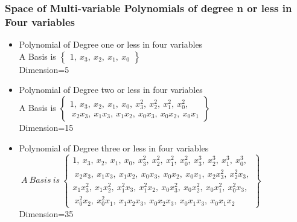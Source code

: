 \documentclass{beamer}
\begin{document}
\begin{frame}
\frametitle{Space of Multi-variable Polynomials of degree n or less in Four variables}
\begin{block}{}
\begin{itemize}
\item Polynomial of Degree one or less in four variables\\ 
A Basis is $\begin{Bmatrix}1,~ x_3,~ x_2,~ x_1,~ x_0
\end{Bmatrix}$\\
Dimension=5\\
\item Polynomial of Degree two or less in four variables \\
A Basis is $\begin{Bmatrix}1,~ x_3,~ x_2,~ x_1,~ x_0,~ x_3^2,~ x_2^2,~ x_1^2,~ x_0^2,\\~ x_2x_3,~ x_1x_3,~ x_1x_2,~ x_0x_3,~ x_0x_2,~ x_0x_1
\end{Bmatrix}$\\
Dimension=15\\
\item Polynomial of Degree three or less in four variables \\
\newcommand\fontsizex{\fontsize{10pt}{7pt}\selectfont}
{\fontsizex $~A~Basis~is~\begin{Bmatrix}1,~ x_3,~ x_2,~ x_1,~ x_0,~ x_3^2,~ x_2^2,~ x_1^2,~ x_0^2,~ x_3^3,~ x_2^3,~ x_1^3,~ x_0^3,\\~ x_2x_3,~ x_1x_3,~ x_1x_2,~ x_0x_3,~ x_0x_2,~ x_0x_1,~ x_2x_3^2,~ x_2^2x_3,\\x_1x_3^2,~ x_1x_2^2,~ x_1^2x_3,~ x_1^2x_2,~ x_0x_3^2,~ x_0x_2^2,~ x_0x_1^2,~ x_0^2x_3,\\~ x_0^2x_2,~ x_0^2x_1,~ x_1x_2x_3,~ x_0x_2x_3,~ x_0x_1x_3,~ x_0x_1x_2
\end{Bmatrix}$}
Dimension=35
\end{itemize}
\end{block}
\end{frame}
\end{document}
